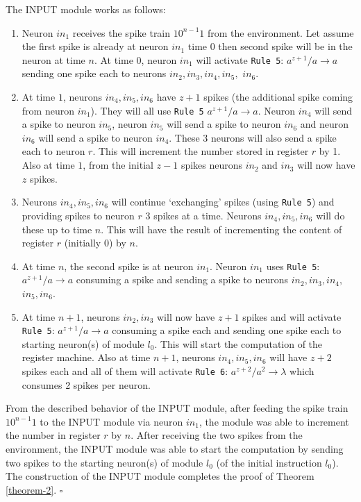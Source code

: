 \documentclass[smallextended]{svjour3}
\begin{document}
The INPUT module works as follows:

\begin{enumerate}
   \item Neuron $in_1$ receives the spike train $10^{n-1}1$ from the environment. Let assume the first spike is already at neuron $in_1$ time $0$
         then second spike will be in the neuron at time $n$. At time $0$, neuron $in_1$ will activate \texttt{Rule 5}: $a^{z+1}/a \rightarrow a$  
          sending one spike each to neurons $in_2, in_3, in_4, in_5,$ $ in_6$.
   \item At time $1$, neurons $in_4, in_5, in_6$ have $z+1$ spikes (the additional spike coming from neuron $in_1$). They will all use 
         \texttt{Rule 5} $a^{z+1}/a \rightarrow a$. Neuron $in_4$ will send a spike to neuron $in_5$, neuron $in_5$ will send a spike to neuron
         $in_6$ and neuron $in_6$ will send a spike to neuron $in_4$. These 3 neurons will also send a spike each to neuron $r$. This will increment
         the number stored in register $r$ by 1. Also at time $1$, from the initial $z-1$ spikes neurons $in_2$ and $in_3$ will now have $z$ spikes.
   \item Neurons $in_4, in_5, in_6$ will continue `exchanging' spikes (using \texttt{Rule 5}) and providing spikes to neuron $r$ 3 spikes at a time.
         Neurons $in_4, in_5, in_6$ will do these up to time $n$. This will have the result of incrementing the content of register $r$ (initially 0)
         by $n$.
   \item At time $n$, the second spike is at neuron $in_1$. Neuron $in_1$ uses \texttt{Rule 5}: $a^{z+1}/a \rightarrow a$ consuming a spike and 
         sending a spike to neurons $in_2,in_3, in_4,$ $in_5, in_6$.
   \item At time $n+1$, neurons $in_2, in_3$ will now have $z+1$ spikes and will activate \texttt{Rule 5}: $a^{z+1}/a \rightarrow a$ consuming a spike 
         each and sending one spike each to starting neuron(s) of module $l_{0}$. This will start the computation of the register machine. Also 
         at time $n+1$, neurons $in_4, in_5, in_6$ will have $z+2$ spikes each and all of them will activate \texttt{Rule 6}: $a^{z+2}/a^2 \rightarrow 
         \lambda$ which consumes 2 spikes per neuron.
\end{enumerate}

From the described behavior of the INPUT module, after feeding the spike train $10^{n-1}1$ to the INPUT module via neuron $in_1$, the module was able
to increment the number in register $r$ by $n$. After receiving the two spikes from the environment, the INPUT module was able to start the 
computation by sending two spikes to the starting neuron(s) of module $l_0$ (of the initial instruction $l_0$). The construction of the INPUT module
completes the proof of Theorem \ref{theorem-2}. $\square$
   
\end{document}
